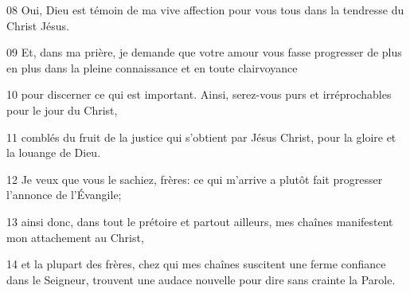 
08 Oui, Dieu est témoin de ma vive affection pour vous tous dans la tendresse du Christ Jésus.

09 Et, dans ma prière, je demande que votre amour vous fasse progresser de plus en plus dans la pleine connaissance et en toute clairvoyance

10 pour discerner ce qui est important. Ainsi, serez-vous purs et irréprochables pour le jour du Christ,

11 comblés du fruit de la justice qui s’obtient par Jésus Christ, pour la gloire et la louange de Dieu.

12 Je veux que vous le sachiez, frères: ce qui m’arrive a plutôt fait progresser l’annonce de l’Évangile;

13 ainsi donc, dans tout le prétoire et partout ailleurs, mes chaînes manifestent mon attachement au Christ,

14 et la plupart des frères, chez qui mes chaînes suscitent une ferme confiance dans le Seigneur, trouvent une audace nouvelle pour dire sans crainte la Parole.
